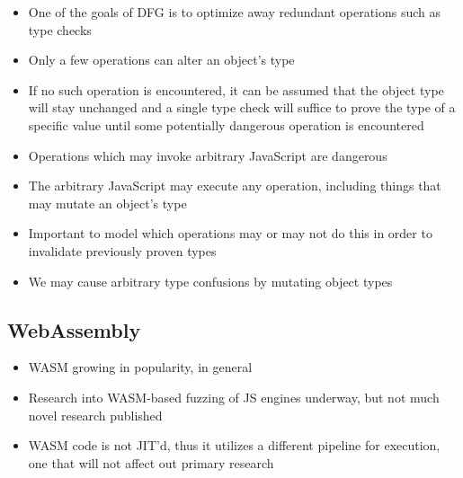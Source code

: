 
\begin{itemize}
  \item One of the goals of DFG is to optimize away redundant operations such as type checks
  \item Only a few operations can alter an object’s type
  \item If no such operation is encountered, it can be
  assumed that the object type will stay unchanged
  and a single type check will suﬃce to prove the type
  of a specific value until some potentially dangerous
  operation is encountered
  \item Operations which may invoke arbitrary JavaScript are dangerous
  \item The arbitrary JavaScript may execute any operation, including things that may mutate an object’s type
  \item Important to model which operations may or may not do this in order to invalidate previously proven types
  \item We may cause arbitrary type confusions by mutating object types
\end{itemize}



\subsection{WebAssembly}


\begin{itemize}
    \item WASM growing in popularity, in general
    \item Research into WASM-based fuzzing of JS engines underway, but not much novel research published
    \item WASM code is not JIT'd, thus it utilizes a different pipeline for execution, one that will not affect out primary research
\end{itemize}
%
